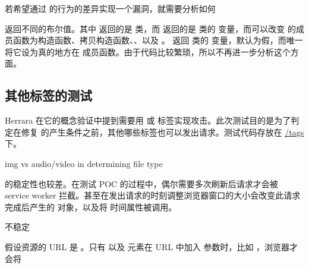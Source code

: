 若希望通过  的行为的差异实现一个漏洞，就需要分析如何

\noindent{} 返回不同的布尔值。其中  返回的是  类，而  返回的是  类的  变量，而可以改变  的成员函数为构造函数、拷贝构造函数、、以及 。 返回  类的  变量，默认为假，而唯一将它设为真的地方在  成员函数。由于代码比较繁琐，所以不再进一步分析这个方面。

\subsection{其他标签的测试}

Herrara 在它的概念验证中提到需要用  或  标签实现攻击。此次测试目的是为了判定在修复  的产生条件之前，其他哪些标签也可以发出请求。测试代码存放在 \href{https://github.com/georgetian3/xsleaks/tree/main/src/tags}{/tags} 下。


img vs audio/video in determining file type



 的稳定性也较差。在测试 POC 的过程中，偶尔需要多次刷新后请求才会被 service worker 拦截。甚至在发出请求的时刻调整浏览器窗口的大小会改变此请求完成后产生的  对象，以及将  时间属性被调用。


不稳定
    
    
    假设资源的 URL 是 。只有  以及  元素在 URL 中加入  参数时，比如 ，浏览器才会将